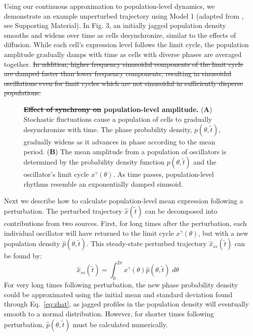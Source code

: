 \documentclass[11pt, letterpaper]{article}
\providecommand{\DIFadd}[1]{{\protect\color{blue}\uwave{#1}}} %
\providecommand{\DIFdel}[1]{{\protect\color{red}\sout{#1}}}                      %
\providecommand{\DIFdelbegin}{} %
\providecommand{\DIFdelend}{} %
\providecommand{\DIFaddFL}[1]{\DIFadd{#1}} %
\providecommand{\DIFdelFL}[1]{\DIFdel{#1}} %
\providecommand{\DIFaddbeginFL}{} %
\providecommand{\DIFaddendFL}{} %
\providecommand{\DIFdelbeginFL}{} %
\providecommand{\DIFdelendFL}{} %
\begin{document}
Using our continuous approximation to population-level dynamics, we demonstrate
an example unperturbed trajectory using Model 1 (adapted from \cite{Novak2008},
see Supporting Material). In Fig. 3, an initially jagged population density
smooths and widens over time as cells desynchronize, similar to the effects of
diffusion. While each cell's expression level follows the limit cycle, the
population amplitude gradually damps with time as cells with diverse phases are
averaged together. 
\DIFdelbegin \DIFdel{In addition, higher frequency sinusoidal components of the
limit cycle are damped faster than lower frequency components, resulting in
sinusoidal oscillations even for limit cycles which are not sinusoidal in
sufficiently disperse populations.
}\DIFdelend 

\begin{figure}[tbp]
  \begin{center}
    \caption{{\bfseries \DIFdelbeginFL \DIFdelFL{Effect of synchrony on }\DIFdelendFL \DIFaddbeginFL \DIFaddFL{Synchrony effects }\DIFaddendFL population-level amplitude.}
    ({\bfseries A}) Stochastic fluctuations cause a population of cells to
    gradually desynchronize with time. The phase probability density,
    $p(\theta, \tilde{t})$, gradually widens as it advances in phase according
    to the mean period. ({\bfseries B}) The mean amplitude from a population of
    oscillators is determined by the probability density function $p(\theta,
    \tilde{t})$ and the oscillator's limit cycle $x^\gamma(\theta)$. As time
  passes, population-level rhythms resemble an exponentially damped sinusoid.}
  \end{center}
\end{figure}

Next we describe how to calculate population-level mean expression following a
perturbation. The perturbed trajectory $\hat{x}(\tilde{t})$ can be decomposed
into contributions from two sources. First, for long times after the
perturbation, each individual oscillator will have returned to the limit cycle
$x^\gamma(\theta)$, but with a new population density $\hat{p}(\theta,
\tilde{t})$. This steady-state perturbed trajectory $\hat{x}_{ss}(\tilde{t})$
can be found by:
\begin{equation}
  \hat{x}_{ss}(\tilde{t}) = \int_0^{2\pi} x^\gamma(\theta) \hat{p}(\theta,
  \tilde{t}) \; d\theta
  \label{eq:xhatss}
\end{equation}
For very long times following perturbation, the new phase probability density
could be approximated using the initial mean and standard deviation found
through Eq.~\ref{eq:zhat}, as jagged profiles in the population density will
eventually smooth to a normal distribution. However, for shorter times following
perturbation, $\hat{p}(\theta, \tilde{t})$ must be calculated numerically.
\end{document}
